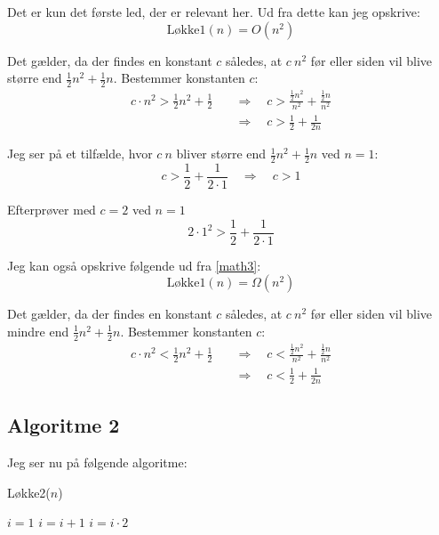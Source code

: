 Det er kun det første led, der er relevant her. Ud fra dette kan jeg opskrive:
\begin{equation*}
	\text{Løkke1}\left(n\right) = O\left(n^2\right)
\end{equation*}

Det gælder, da der findes en konstant $c$ således, at $c\ n^2$ før eller siden vil blive større end $\frac{1}{2}n^2 + \frac{1}{2}n$.
Bestemmer konstanten $c$:
\begin{equation*} \begin{split}
	c\cdot n^2 > \frac{1}{2}n^2 + \frac{1}{2} &\quad\Rightarrow\quad c > \frac{\frac{1}{2}n^2}{n^2} + \frac{\frac{1}{2}n}{n^2}\\
	                                          &\quad\Rightarrow\quad c > \frac{1}{2} + \frac{1}{2n}
\end{split} \end{equation*}

Jeg ser på et tilfælde, hvor $c\ n$ bliver større end $\frac{1}{2}n^2 + \frac{1}{2}n$ ved $n=1$:
\begin{equation*}
	c > \frac{1}{2} + \frac{1}{2\cdot 1} \quad\Rightarrow\quad c > 1
\end{equation*}

Efterprøver med $c=2$ ved $n=1$
\begin{equation*}
	2\cdot 1^2 > \frac{1}{2} + \frac{1}{2\cdot 1}
\end{equation*}

Jeg kan også opskrive følgende ud fra \eqref{math3}:
\begin{equation*}
	\text{Løkke1}\left(n\right) = \Omega\left(n^2\right)
\end{equation*}

Det gælder, da der findes en konstant $c$ således, at $c\ n^2$ før eller siden vil blive mindre end $\frac{1}{2}n^2 + \frac{1}{2}n$.
Bestemmer konstanten $c$:
\begin{equation*} \begin{split}
	c\cdot n^2 < \frac{1}{2}n^2 + \frac{1}{2} &\quad\Rightarrow\quad c < \frac{\frac{1}{2}n^2}{n^2} + \frac{\frac{1}{2}n}{n^2}\\
	                                          &\quad\Rightarrow\quad c < \frac{1}{2} + \frac{1}{2n}
\end{split} \end{equation*}

\subsection*{Algoritme 2}
Jeg ser nu på følgende algoritme:
\begin{algorithm}
	\caption{Løkke2($n$)}
	\label{løkke2}
	\begin{algorithmic}[1]
		\State $i = 1$
				\State $i = i + 1$
			\EndFor
			\State $i = i\cdot 2$
		\EndWhile
	\end{algorithmic}
\end{algorithm}